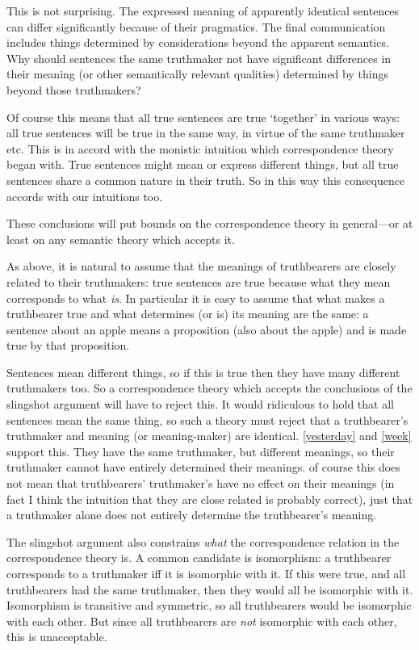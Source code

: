 This is not surprising.
The expressed meaning of apparently identical sentences can differ significantly because of their pragmatics.
The final communication includes things determined by considerations beyond the apparent semantics. %
Why should sentences the same truthmaker not have significant differences in their meaning (or other semantically relevant qualities) determined by things beyond those truthmakers?

Of course this means that all true sentences are true `together' in various ways: all true sentences will be true in the same way, in virtue of the same truthmaker etc.
This is in accord with the monistic intuition which correspondence theory began with.
True sentences might mean or express different things, but all true sentences share a common nature in their truth.
So in this way this consequence accords with our intuitions too.

These conclusions will put bounds on the correspondence theory in general---or at least on any semantic theory which accepts it.

As above, it is natural to assume that the meanings of truthbearers are closely related to their truthmakers: true sentences are true because what they mean corresponds to what \emph{is}.
In particular it is easy to assume that what makes a truthbearer true and what determines (or is) its meaning are the same: a sentence about an apple means a proposition (also about the apple) and is made true by that proposition.

Sentences mean different things, so if this is true then they have many different truthmakers too.
So a correspondence theory which accepts the conclusions of the slingshot argument will have to reject this.
It would ridiculous to hold that all sentences mean the same thing, so such a theory must reject that a truthbearer's truthmaker and meaning (or meaning-maker) are identical.
\ref{yesterday} and \ref{week} support this.
They have the same truthmaker, but different meanings, so their truthmaker cannot have entirely determined their meanings.
of course this does not mean that truthbearers' truthmaker's have no effect on their meanings (in fact I think the intuition that they are close related is probably correct), just that a truthmaker alone does not entirely determine the truthbearer's meaning.

The slingshot argument also constrains \emph{what} the correspondence relation in the correspondence theory is.
A common candidate is isomorphism: a truthbearer corresponds to a truthmaker iff it is isomorphic with it.
If this were true, and all truthbearers had the same truthmaker, then they would all be isomorphic with it.
Isomorphism is transitive and symmetric, so all truthbearers would be isomorphic with each other.
But since all truthbearers are \emph{not} isomorphic with each other, this is unacceptable.

